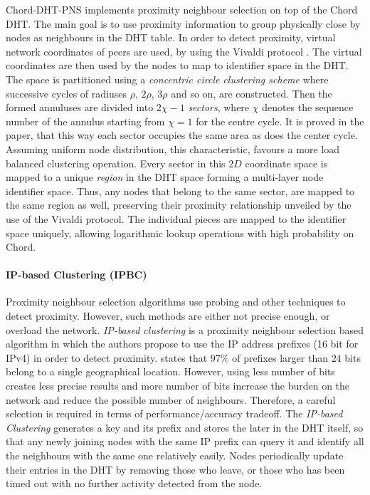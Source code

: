 \documentclass[acmcsur,acmnow]{acmtrans2m}
\begin{document}
Chord-DHT-PNS \cite{hancong_pnsbased_2006} implements proximity neighbour
selection on top of the Chord DHT. The main goal is to use proximity
information to group physically close by nodes as neighbours in the DHT table.
In order to detect proximity, virtual network coordinates of peers are used, by
using the Vivaldi protocol \cite{cox_vivaldi_2004}. The virtual coordinates are
then used by the nodes to map to identifier space in the DHT. The space is
partitioned using a \emph{concentric circle clustering scheme} where successive
cycles of radiuses $\rho$, $2\rho$, $3\rho$ and so on, are constructed. Then the
formed annuluses are divided into $2\chi-1$ \emph{sectors}, where $\chi$ denotes
the sequence number of the annulus starting from $\chi = 1$ for the centre
cycle. It is proved in the paper, that this way each sector occupies the same
area as does the center cycle. Assuming uniform node distribution, this
characteristic, favours a more load balanced clustering operation. Every sector
in this $2D$ coordinate space is mapped to a unique \emph{region} in the DHT
space forming a multi-layer node identifier space.  Thus, any nodes that belong
to the same sector, are mapped to the same region as well, preserving their
proximity relationship unveiled by the use of the Vivaldi protocol. The
individual pieces are mapped to the identifier space uniquely, allowing
logarithmic lookup operations with high probability on Chord.

\paragraph*{\bf IP-based Clustering (IPBC)}
Proximity neighbour selection algorithms use probing and other techniques
to detect proximity. However, such methods are either not precise enough, or
overload the network. \emph{IP-based clustering}
\cite{karwaczynski_ipbc_2007} is a proximity neighbour selection based
algorithm in which the authors propose to use the IP address prefixes (16 bit
for IPv4) in order to detect proximity.  \cite{freedman_iploc_2005} states that
$97\%$ of prefixes larger than $24$ bits belong to a single geographical
location. However, using less number of bits creates less precise results and
more number of bits increase the burden on the network and reduce the possible
number of neighbours. Therefore, a careful selection is required in terms of
performance/accuracy tradeoff. The {\em IP-based Clustering} generates a key and
its prefix and stores the later in the DHT itself, so that any newly joining
nodes with the same IP prefix can query it and identify all the
neighbours with the same one relatively easily. Nodes periodically update
their entries in the DHT by removing those who leave, or those who has been timed out with no further activity detected from the node.
\end{document}

